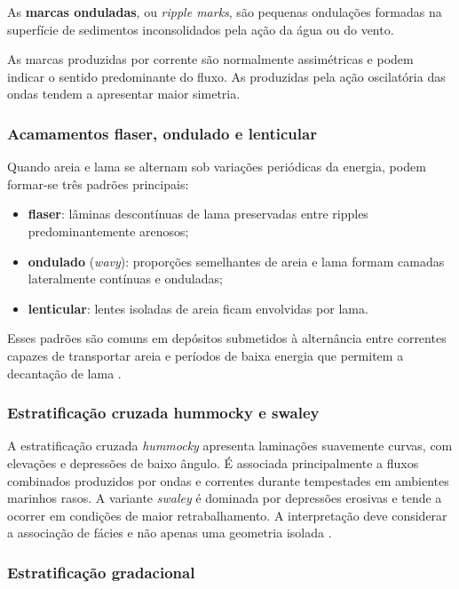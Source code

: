 As \textbf{marcas onduladas}, ou \textit{ripple marks}, são pequenas ondulações
formadas na superfície de sedimentos inconsolidados pela ação da água ou do
vento.

As marcas produzidas por corrente são normalmente assimétricas e podem indicar o
sentido predominante do fluxo. As produzidas pela ação oscilatória das ondas
tendem a apresentar maior simetria.

\subsubsection{Acamamentos flaser, ondulado e lenticular}

Quando areia e lama se alternam sob variações periódicas da energia, podem formar-se três padrões principais:

\begin{itemize}
  \item \textbf{flaser}: lâminas descontínuas de lama preservadas entre ripples predominantemente arenosos;
  \item \textbf{ondulado} (\textit{wavy}): proporções semelhantes de areia e lama formam camadas lateralmente contínuas e onduladas;
  \item \textbf{lenticular}: lentes isoladas de areia ficam envolvidas por lama.
\end{itemize}

Esses padrões são comuns em depósitos submetidos à alternância entre correntes capazes de transportar areia e períodos de baixa energia que permitem a decantação de lama \parencite{nichols2009}.

\subsubsection{Estratificação cruzada hummocky e swaley}

A estratificação cruzada \textit{hummocky} apresenta laminações suavemente curvas, com elevações e depressões de baixo ângulo. É associada principalmente a fluxos combinados produzidos por ondas e correntes durante tempestades em ambientes marinhos rasos. A variante \textit{swaley} é dominada por depressões erosivas e tende a ocorrer em condições de maior retrabalhamento. A interpretação deve considerar a associação de fácies e não apenas uma geometria isolada \parencite{harms1975,nichols2009}.

\subsubsection{Estratificação gradacional}

